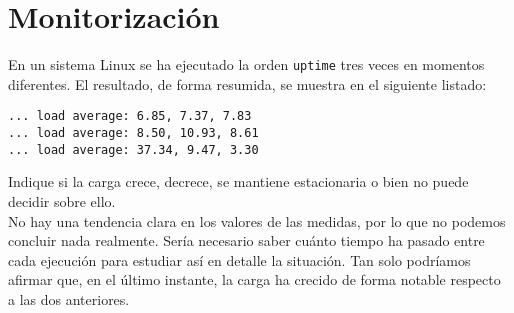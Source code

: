 \setcounter{section}{2}
\section{Monitorización}

\begin{ejercicio}
    En un sistema Linux se ha ejecutado la orden \verb|uptime| tres veces en momentos diferentes. El resultado, de forma resumida, se muestra en el siguiente listado:
    \begin{verbatim}
... load average: 6.85, 7.37, 7.83
... load average: 8.50, 10.93, 8.61
... load average: 37.34, 9.47, 3.30
    \end{verbatim}

    Indique si la carga crece, decrece, se mantiene estacionaria o bien no puede decidir sobre ello.\\

    No hay una tendencia clara en los valores de las medidas, por lo que no podemos concluir nada realmente. Sería necesario saber cuánto tiempo ha pasado entre cada ejecución para estudiar así en detalle la situación. Tan solo podríamos afirmar que, en el último instante, la carga ha crecido de forma notable respecto a las dos anteriores.
\end{ejercicio}
\begin{comment}
    Solución: No se puede decidir sobre la evolución porque no hay una tendencia clara en los valores de las medidas.
\end{comment}

